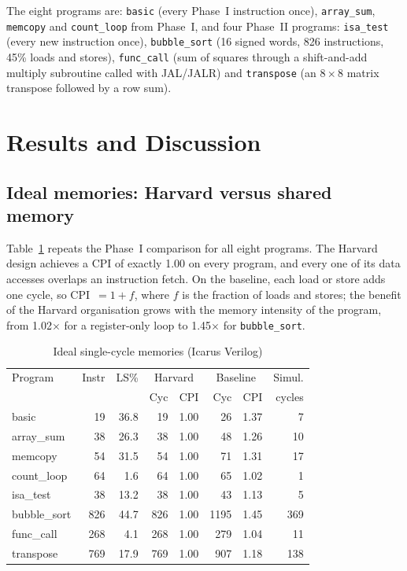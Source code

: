 \documentclass[conference]{IEEEtran}
\begin{document}
The eight programs are: \texttt{basic} (every Phase~I instruction once),
\texttt{array\_sum}, \texttt{memcopy} and \texttt{count\_loop} from Phase~I,
and four Phase~II programs: \texttt{isa\_test} (every new instruction once),
\texttt{bubble\_sort} (16 signed words, 826 instructions, 45\% loads and
stores), \texttt{func\_call} (sum of squares through a shift-and-add multiply
subroutine called with JAL/JALR) and \texttt{transpose} (an $8\times8$ matrix
transpose followed by a row sum).

\section{Results and Discussion}

\subsection{Ideal memories: Harvard versus shared memory}
Table~\ref{tab:results} repeats the Phase~I comparison for all eight
programs. The Harvard design achieves a CPI of exactly 1.00 on every program,
and every one of its data accesses overlaps an instruction fetch. On the
baseline, each load or store adds one cycle, so CPI~$=1+f$, where $f$ is the
fraction of loads and stores; the benefit of the Harvard organisation grows
with the memory intensity of the program, from 1.02$\times$ for a
register-only loop to 1.45$\times$ for \texttt{bubble\_sort}.

\begin{table}[t]
\caption{Ideal single-cycle memories (Icarus Verilog)}
\label{tab:results}
\centering
\setlength{\tabcolsep}{3pt}
\begin{tabular}{lrrrrrrr}
\toprule
Program & Instr & LS\% & \multicolumn{2}{c}{Harvard} & \multicolumn{2}{c}{Baseline} & Simul. \\
 & & & Cyc & CPI & Cyc & CPI & cycles \\
\midrule
basic        &  19 & 36.8 &  19 & 1.00 &   26 & 1.37 &   7 \\
array\_sum   &  38 & 26.3 &  38 & 1.00 &   48 & 1.26 &  10 \\
memcopy      &  54 & 31.5 &  54 & 1.00 &   71 & 1.31 &  17 \\
count\_loop  &  64 &  1.6 &  64 & 1.00 &   65 & 1.02 &   1 \\
isa\_test    &  38 & 13.2 &  38 & 1.00 &   43 & 1.13 &   5 \\
bubble\_sort & 826 & 44.7 & 826 & 1.00 & 1195 & 1.45 & 369 \\
func\_call   & 268 &  4.1 & 268 & 1.00 &  279 & 1.04 &  11 \\
transpose    & 769 & 17.9 & 769 & 1.00 &  907 & 1.18 & 138 \\
\bottomrule
\end{tabular}
\end{table}
\end{document}
